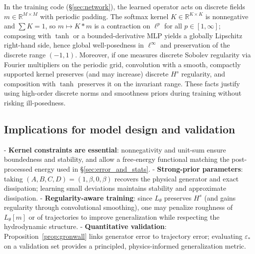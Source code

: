 \documentclass[11pt,a4paper]{article}
\theoremstyle{plain}
\theoremstyle{definition}
\theoremstyle{remark}
\begin{document}
In the training code (\S\ref{sec:network}), the learned operator acts on discrete fields $m\in\mathbb{R}^{M\times M}$ with periodic padding. The softmax kernel $K\in\mathbb{R}^{K\times K}$ is nonnegative and $\sum K=1$, so $m\mapsto K\ast m$ is a contraction on $\ell^p$ for all $p\in[1,\infty]$;
composing with $\tanh$ or a bounded-derivative MLP yields a globally Lipschitz right-hand side, hence global well-posedness in $\ell^\infty$ and preservation of the discrete range $(-1,1)$. Moreover, if one measures discrete Sobolev regularity via Fourier multipliers on the periodic grid, convolution with a smooth, compactly supported kernel preserves (and may increase) discrete $H^s$ regularity, and composition with $\tanh$ preserves it on the invariant range. These facts justify using high-order discrete norms and smoothness priors during training without risking ill-posedness.

\subsection{Implications for model design and validation}

- \textbf{Kernel constraints are essential}: nonnegativity and unit-sum ensure boundedness and stability, and allow a free-energy functional matching the post-processed energy used in \S\ref{sec:error_and_stats}.
- \textbf{Strong-prior parameters}: taking $(A,B,C,D)=(1,\beta,0,\beta)$ recovers the physical generator and exact dissipation; learning small deviations maintains stability and approximate dissipation.
- \textbf{Regularity-aware training}: since $L_\theta$ preserves $H^s$ (and gains regularity through convolutional smoothing), one may penalize roughness of $L_\theta[m]$ or of trajectories to improve generalization while respecting the hydrodynamic structure.
- \textbf{Quantitative validation}: Proposition~\ref{prop:gronwall} links generator error to trajectory error; evaluating $\varepsilon_*$ on a validation set provides a principled, physics-informed generalization metric.


\end{document}
